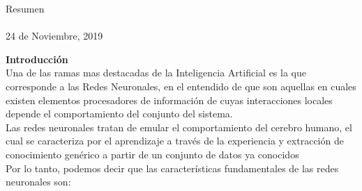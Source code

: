 \documentclass[12pt]{article}
\begin{document}
\begin{center}
\begin{minipage}{0.42\textwidth}
\begin{center}
            \end{center}
        \end{minipage}
        \vspace*{1cm}

        \vspace{2cm}
        \begin{center}
            Resumen\\
            {\small }\\
            {\large 24 de Noviembre, 2019}
        \end{center}                                                             
    \end{center}
    \newpage

    {\bf Introducción}\\
    
        Una de las ramas mas destacadas de la Inteligencia Artificial es la que corresponde a las Redes Neuronales, en el entendido de que son aquellas en cuales existen elementos procesadores de información de cuyas interacciones locales depende el comportamiento del conjunto del sistema.\\
        
        Las redes neuronales tratan de emular el comportamiento del cerebro humano, el cual se caracteriza por el aprendizaje a través de la experiencia y extracción de conocimiento genérico a partir de un conjunto de datos ya conocidos\\
        
        Por lo tanto, podemos decir que las características fundamentales de las redes neuronales son: 
        
\end{document}
